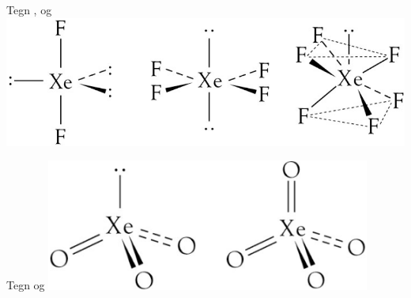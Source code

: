 
\begin{flashcard}[Struktur]{Tegn ,  og }
\includegraphics[width=1\textwidth]{figures/k18s493XeF.png}
\end{flashcard}

\begin{flashcard}[Struktur]{Tegn  og }
\includegraphics[width=0.8\textwidth]{figures/k18s494XeO.png}
\end{flashcard}